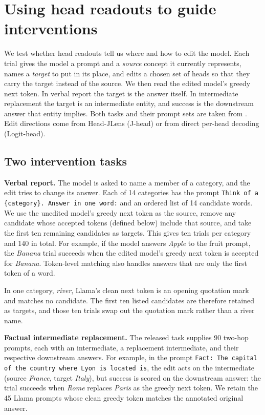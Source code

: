 \documentclass[11pt,a4paper]{article}
\newcommand{\code}[1]{\texttt{#1}}       %
\begin{document}
\section{Using head readouts to guide interventions}\label{sec:4}

We test whether head readouts tell us where and how to edit the model. Each trial gives the model a prompt and a \emph{source} concept it currently represents, names a \emph{target} to put in its place, and edits a chosen set of heads so that they carry the target instead of the source. We then read the edited model's greedy next token. In verbal report the target is the answer itself. In intermediate replacement the target is an intermediate entity, and success is the downstream answer that entity implies. Both tasks and their prompt sets are taken from \citet{gurnee2026}. Edit directions come from Head-JLens (J-head) or from direct per-head decoding (Logit-head).

\subsection{Two intervention tasks}\label{sec:4.1}

\textbf{Verbal report.} The model is asked to name a member of a category, and the edit tries to change its answer. Each of 14 categories has the prompt \code{Think of a \{category\}. Answer in one word:} and an ordered list of 14 candidate words. We use the unedited model's greedy next token as the source, remove any candidate whose accepted tokens (defined below) include that source, and take the first ten remaining candidates as targets. This gives ten trials per category and 140 in total. For example, if the model answers \emph{Apple} to the fruit prompt, the \emph{Banana} trial succeeds when the edited model's greedy next token is accepted for \emph{Banana}. Token-level matching also handles answers that are only the first token of a word.

In one category, \emph{river}, Llama's clean next token is an opening quotation mark and matches no candidate. The first ten listed candidates are therefore retained as targets, and those ten trials swap out the quotation mark rather than a river name.

\textbf{Factual intermediate replacement.} The released task supplies 90 two-hop prompts, each with an intermediate, a replacement intermediate, and their respective downstream answers. For example, in the prompt \code{Fact: The capital of the country where Lyon is located is}, the edit acts on the intermediate (source \emph{France}, target \emph{Italy}), but success is scored on the downstream answer: the trial succeeds when \emph{Rome} replaces \emph{Paris} as the greedy next token. We retain the 45 Llama prompts whose clean greedy token matches the annotated original answer.
\end{document}
